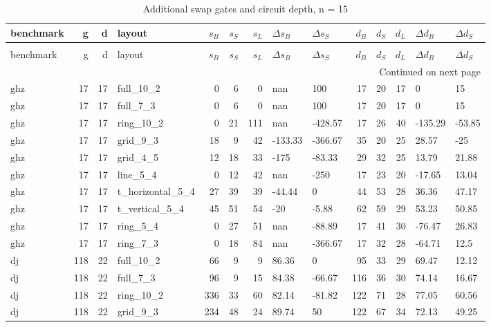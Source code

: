 \begin{longtable}{lrrlrrrllrrrll}
\caption{Additional swap gates and circuit depth, n = 15} \label{benchmark-table-15} \\
\toprule
benchmark & g & d & layout & $s_B$ & $s_S$ & $s_L$ & $\Delta s_B$ & $\Delta s_S$ & $d_B$ & $d_S$ & $d_L$ & $\Delta d_B$ & $\Delta d_S$ \\
\midrule
\endfirsthead
\caption[]{Additional swap gates and circuit depth, n = 15} \\
\toprule
benchmark & g & d & layout & $s_B$ & $s_S$ & $s_L$ & $\Delta s_B$ & $\Delta s_S$ & $d_B$ & $d_S$ & $d_L$ & $\Delta d_B$ & $\Delta d_S$ \\
\midrule
\endhead
\midrule
\multicolumn{14}{r}{Continued on next page} \\
\midrule
\endfoot
\bottomrule
\endlastfoot
ghz & 17 & 17 & full\_10\_2 & 0 & 6 & 0 & nan & 100 & 17 & 20 & 17 & 0 & 15 \\
ghz & 17 & 17 & full\_7\_3 & 0 & 6 & 0 & nan & 100 & 17 & 20 & 17 & 0 & 15 \\
ghz & 17 & 17 & ring\_10\_2 & 0 & 21 & 111 & nan & -428.57 & 17 & 26 & 40 & -135.29 & -53.85 \\
ghz & 17 & 17 & grid\_9\_3 & 18 & 9 & 42 & -133.33 & -366.67 & 35 & 20 & 25 & 28.57 & -25 \\
ghz & 17 & 17 & grid\_4\_5 & 12 & 18 & 33 & -175 & -83.33 & 29 & 32 & 25 & 13.79 & 21.88 \\
ghz & 17 & 17 & line\_5\_4 & 0 & 12 & 42 & nan & -250 & 17 & 23 & 20 & -17.65 & 13.04 \\
ghz & 17 & 17 & t\_horizontal\_5\_4 & 27 & 39 & 39 & -44.44 & 0 & 44 & 53 & 28 & 36.36 & 47.17 \\
ghz & 17 & 17 & t\_vertical\_5\_4 & 45 & 51 & 54 & -20 & -5.88 & 62 & 59 & 29 & 53.23 & 50.85 \\
ghz & 17 & 17 & ring\_5\_4 & 0 & 27 & 51 & nan & -88.89 & 17 & 41 & 30 & -76.47 & 26.83 \\
ghz & 17 & 17 & ring\_7\_3 & 0 & 18 & 84 & nan & -366.67 & 17 & 32 & 28 & -64.71 & 12.5 \\
dj & 118 & 22 & full\_10\_2 & 66 & 9 & 9 & 86.36 & 0 & 95 & 33 & 29 & 69.47 & 12.12 \\
dj & 118 & 22 & full\_7\_3 & 96 & 9 & 15 & 84.38 & -66.67 & 116 & 36 & 30 & 74.14 & 16.67 \\
dj & 118 & 22 & ring\_10\_2 & 336 & 33 & 60 & 82.14 & -81.82 & 122 & 71 & 28 & 77.05 & 60.56 \\
dj & 118 & 22 & grid\_9\_3 & 234 & 48 & 24 & 89.74 & 50 & 122 & 67 & 34 & 72.13 & 49.25 \\

\end{longtable}
